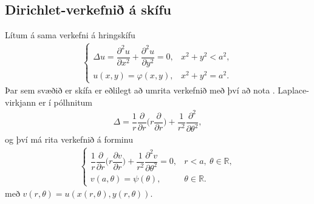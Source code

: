 \documentclass[a4paper,10pt,icelandic]{sphinxmanual}
\begin{document}
\subsection{Dirichlet-verkefnið á skífu}
\label{\detokenize{Kafli03:dirichlet-verkefni-a-skifu}}
Lítum á sama verkefni á hringskífu
\begin{equation*}
\begin{split}\begin{cases} \Delta u=
 \dfrac{\partial^2u}{\partial x^2}+
 \dfrac{\partial^2u}{\partial y^2}=0, &x^2+y^2<a^2,\\
 u(x,y)=\varphi(x,y), &x^2+y^2=a^2.
 \end{cases}\end{split}
\end{equation*}
Þar sem svæðið er skífa er eðlilegt að umrita verkefnið með því að nota .
Laplace-virkjann er í pólhnitum
\begin{equation*}
\begin{split}\Delta = \dfrac 1r\dfrac{\partial}{\partial r}
 \bigg(r\dfrac{\partial }{\partial r}\bigg)
 +\dfrac 1{r^2}\dfrac{\partial^2 }{\partial\theta^2},\end{split}
\end{equation*}
og því má rita verkefnið á forminu
\begin{equation*}
\begin{split}\begin{cases}
 \dfrac 1r\dfrac{\partial}{\partial r}
 \bigg(r\dfrac{\partial v}{\partial r}\bigg)
 +\dfrac 1{r^2}\dfrac{\partial^2 v}{\partial\theta^2}=0, &r<a,
 \ {\theta}\in {{\mathbb  R}},\\
 v(a,\theta)={\psi}(\theta), &{\theta}\in {{\mathbb  R}}.
 \end{cases}\end{split}
\end{equation*}
með \(v(r,\theta) = u(x(r,\theta),y(r,\theta))\).
\end{document}
